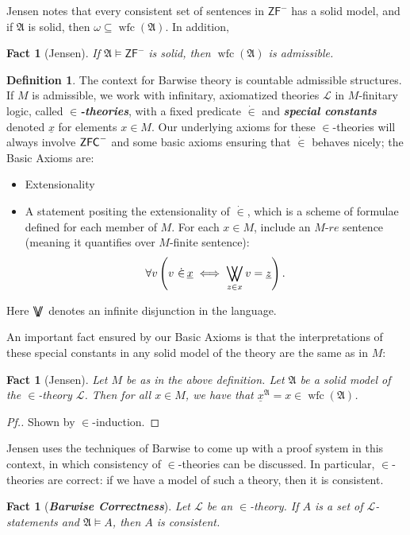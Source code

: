 \documentclass{amsart}
\newtheorem{fact}[theorem]{Fact}
\theoremstyle{definition}
\newtheorem{definition}[theorem]{Definition}
\theoremstyle{remark}
\newcommand{\ZFC}{\textup{\ensuremath{\textsf{ZFC}}}}
\DeclareMathOperator{\wfc}{wfc}
\DeclareMathOperator*{\bigdoublevee}{\bigvee\mkern-15mu\bigvee}
\begin{document}
Jensen \cite[Section 1.2]{Jensen:2012fr} notes that every consistent set of sentences in $\textsf{ZF}^-$ has a solid model, and if $\mathfrak A$ is solid, then $\omega \subseteq \wfc(\mathfrak A)$. In addition,

\begin{fact}[Jensen] If $\mathfrak A \models \textsf{ZF}^-$ is solid, then $\wfc(\mathfrak A)$ is admissible. \end{fact}

\begin{definition} \label{def:InTheoriesAndBasicAxioms} The context for Barwise theory is countable admissible structures. If $M$ is admissible, we work with infinitary, axiomatized theories $\mathcal L$ in $M$-finitary logic, called \textit{\textbf{$\in$-theories}}, with a fixed predicate $\dot \in$ and \textbf{\emph{special constants}} denoted $\underline x$ for elements $x \in M$. Our underlying axioms for these $\in$-theories will always involve $\ZFC^-$ and some basic axioms ensuring that $\dot \in$ behaves nicely; 
the \textsf{Basic Axioms} are: \begin{itemize}
	\item \textsf{Extensionality}
	\item A statement positing the extensionality of $\dot \in$, which is a scheme of formulae defined for each member of $M$. For each $x \in M$, include an $M$-$re$ sentence (meaning it quantifies over $M$-finite sentence): 
	$$\forall v \left( v \ \dot \in\, \underline x \iff \bigdoublevee_{z \in x} v= \underline z \right).$$
\end{itemize} Here $\bigdoublevee$ denotes an infinite disjunction in the language.\end{definition}

An important fact ensured by our \textsf{Basic Axioms} is that the interpretations of these special constants in any solid model of the theory are the same as in $M$:

\begin{fact}[Jensen] Let $M$ be as in the above definition. Let $\mathfrak A$ be a solid model of the $\in$-theory $\mathcal L$. Then for all $x \in M$, we have that $\underline{x}^{\mathfrak A} = x \in \wfc(\mathfrak A)$. \end{fact}
\begin{proof}[Pf.] Shown by $\in$-induction. \end{proof}

Jensen uses the techniques of Barwise to come up with a proof system in this context, in which consistency of $\in$-theories can be discussed. In particular, $\in$-theories are correct: if we have a model of such a theory, then it is consistent. 
\begin{fact}[\textbf{\emph{Barwise Correctness}}] \label{fact:correctness} 
Let $\mathcal L$ be an $\in$-theory. If $A$ is a set of $\mathcal L$-statements and $\mathfrak A \models A$, then $A$ is consistent. \end{fact}
\end{document}

